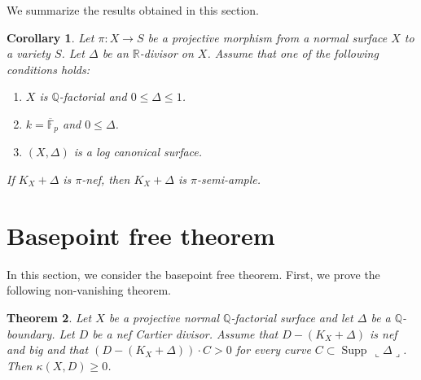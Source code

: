 \documentclass[12pt,twoside]{amsart}
\newcommand{\Supp}[0]{{\operatorname{Supp}}}
\newtheorem{thm}{Theorem}[section]
\newtheorem{cor}[thm]{Corollary}
\theoremstyle{definition}
\newcommand{\Q}{$\mathbb{Q}$}
\begin{document}
We summarize the results obtained in this section. 

\begin{cor}\label{relabundance}
Let $\pi:X\to S$ be a projective morphism 
from a normal surface $X$ to a variety $S$. 
Let $\Delta$ be an $\mathbb{R}$-divisor on $X$. 
Assume that one of the following conditions holds{\em{:}}
\begin{enumerate}
\item[(QF)]{$X$ is \Q-factorial and $0\leq \Delta\leq 1$.}
\item[(FP)]{$k=\overline{\mathbb{F}}_p$ and $0\leq\Delta$.}
\item[(LC)]{$(X, \Delta)$ is a log canonical surface.}
\end{enumerate}
If $K_X+\Delta$ is $\pi$-nef, then $K_X+\Delta$ is $\pi$-semi-ample. 
\end{cor}

\appendix
\def\thesection{A}
\section{Basepoint free theorem}
In this section, we consider the basepoint free theorem. 
First, we prove the following non-vanishing theorem. 


\begin{thm}\label{nonvani}
Let $X$ be a projective normal \Q-factorial surface 
and let $\Delta$ be a $\mathbb{Q}$-boundary. 
Let $D$ be a nef Cartier divisor. 
Assume that $D-(K_X+\Delta)$ is nef and big and 
that $(D-(K_X+\Delta))\cdot C>0$ 
for every curve $C \subset \Supp\,\llcorner\Delta\lrcorner$. 
Then $\kappa(X, D) \geq 0$.
\end{thm}
\end{document}
